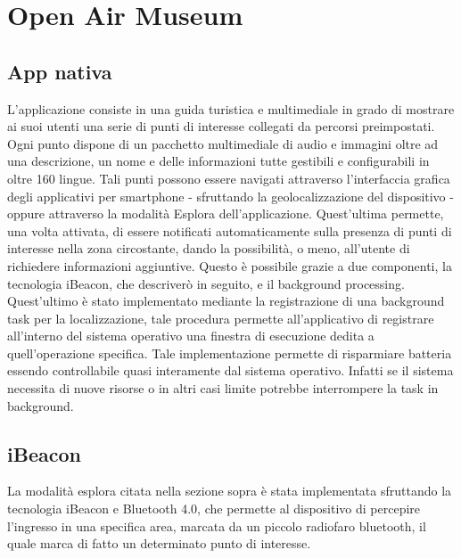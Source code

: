 \chapter{Open Air Museum} %
\label{Open Air Museum}

\vspace{5mm}

\section{App nativa}\vspace{5mm}

L’applicazione consiste in una guida turistica e multimediale in grado di mostrare ai suoi utenti una serie di punti di interesse collegati da percorsi preimpostati. Ogni punto dispone di un pacchetto multimediale di audio e immagini oltre ad una descrizione, un nome e delle informazioni tutte gestibili e configurabili in oltre 160 lingue. Tali punti possono essere navigati attraverso l’interfaccia grafica degli applicativi per smartphone - sfruttando la geolocalizzazione del dispositivo - oppure attraverso la modalità Esplora dell’applicazione. Quest'ultima permette, una volta attivata, di essere notificati automaticamente sulla presenza di punti di interesse nella zona circostante, dando la possibilità, o meno, all’utente di richiedere informazioni aggiuntive. Questo è possibile grazie a due componenti, la tecnologia iBeacon, che descriverò in seguito, e il background processing. Quest'ultimo è stato implementato mediante la registrazione di una background task per la localizzazione, tale procedura permette all'applicativo di registrare all'interno del sistema operativo una finestra di esecuzione dedita a quell'operazione specifica. Tale implementazione permette di risparmiare batteria essendo controllabile quasi interamente dal sistema operativo. Infatti se il sistema necessita di nuove risorse o in altri casi limite potrebbe interrompere la task in background.\vspace{5mm}

\section{iBeacon}\vspace{5mm}

La modalità esplora citata nella sezione sopra è stata implementata sfruttando la tecnologia iBeacon e Bluetooth 4.0, che permette al dispositivo di percepire l’ingresso in una specifica area, marcata da un piccolo radiofaro bluetooth, il quale marca di fatto un determinato punto di interesse.\vspace{5mm}

